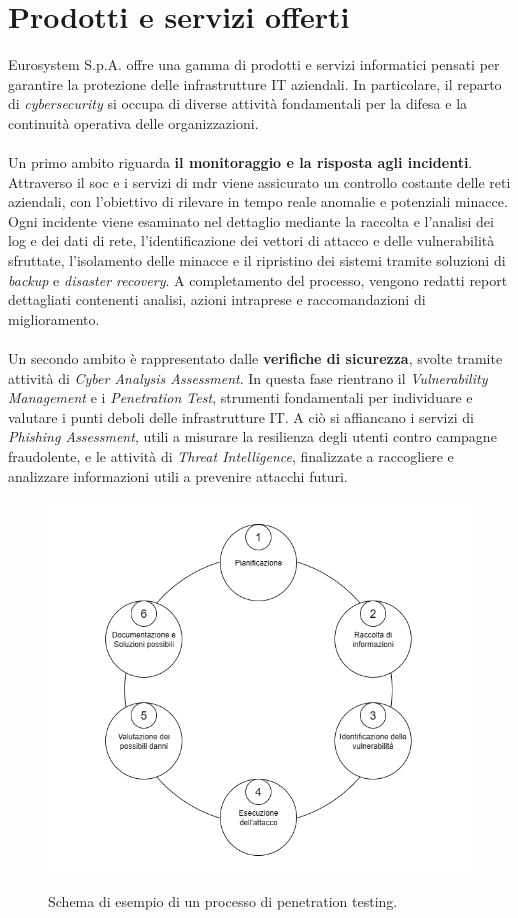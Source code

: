 \section{Prodotti e servizi offerti}  
Eurosystem S.p.A. offre una gamma di prodotti e servizi informatici pensati per garantire la protezione delle infrastrutture IT aziendali. In particolare, il reparto di \textit{cybersecurity} si occupa di diverse attività fondamentali per la difesa e la continuità operativa delle organizzazioni.\\\\  
Un primo ambito riguarda \textbf{il monitoraggio e la risposta agli incidenti}. Attraverso il \gls{soc} e i servizi di \gls{mdr} viene assicurato un controllo costante delle reti aziendali, con l'obiettivo di rilevare in tempo reale anomalie e potenziali minacce. Ogni incidente viene esaminato nel dettaglio mediante la raccolta e l'analisi dei log e dei dati di rete, l'identificazione dei vettori di attacco e delle vulnerabilità sfruttate, l'isolamento delle minacce e il ripristino dei sistemi tramite soluzioni di \textit{backup} e \textit{disaster recovery}. A completamento del processo, vengono redatti report dettagliati contenenti analisi, azioni intraprese e raccomandazioni di miglioramento.\\\\  
Un secondo ambito è rappresentato dalle \textbf{verifiche di sicurezza}, svolte tramite attività di \textit{Cyber Analysis Assessment}. In questa fase rientrano il \textit{Vulnerability Management} e i \textit{Penetration Test}, strumenti fondamentali per individuare e valutare i punti deboli delle infrastrutture IT. A ciò si affiancano i servizi di \textit{Phishing Assessment}, utili a misurare la resilienza degli utenti contro campagne fraudolente, e le attività di \textit{Threat Intelligence}, finalizzate a raccogliere e analizzare informazioni utili a prevenire attacchi futuri.  
\begin{figure}[H]
    \centering
    \includegraphics[alt={Schema Penetration Test}, width=0.95\columnwidth]{img/Pen_test.png}
    \caption{Schema di esempio di un processo di penetration testing.}
    \label{fig:pen_test}    
\end{figure}  
